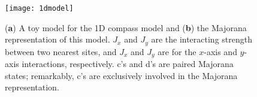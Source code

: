 \documentclass[twocolumn,floats,superscriptaddress]{revtex4}
\begin{document}


\begin{figure}[H]
\centering
\texttt{[image: 1dmodel]}
\caption{ ({\bf a}) A toy model for the 1D compass model and ({\bf b}) the Majorana representation of this model. $J_{x}$ and $J_{y}$ are the interacting strength between two nearest sites, and $J_x$ and $J_y$ are for the $x$-axis and $y$-axis interactions, respectively. {c's and d's} are paired Majorana states; remarkably, c's are exclusively involved in the Majorana representation.} %
\label{figtoy1}
\end{figure}
\end{document}
